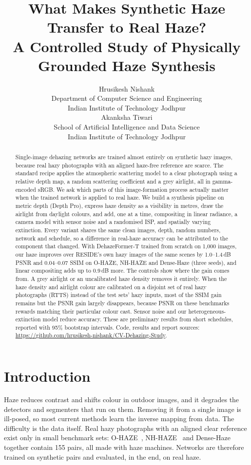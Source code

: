 \documentclass{article}
\title{What Makes Synthetic Haze Transfer to Real Haze?\\A Controlled Study of Physically Grounded Haze Synthesis}
\author{%
  Hrusikesh Nishank \\
  Department of Computer Science and Engineering\\
  Indian Institute of Technology Jodhpur \\
  \And
  Akanksha Tiwari \\
  School of Artificial Intelligence and Data Science\\
  Indian Institute of Technology Jodhpur \\
}
\begin{document}
\maketitle

\begin{abstract}
Single-image dehazing networks are trained almost entirely on synthetic hazy images, because real hazy photographs with an aligned haze-free reference are scarce. The standard recipe applies the atmospheric scattering model to a clear photograph using a relative depth map, a random scattering coefficient and a grey airlight, all in gamma-encoded sRGB. We ask which parts of this image-formation process actually matter when the trained network is applied to real haze. We build a synthesis pipeline on metric depth (Depth Pro), express haze density as a visibility in metres, draw the airlight from daylight colours, and add, one at a time, compositing in linear radiance, a camera model with sensor noise and a randomised ISP, and spatially varying extinction. Every variant shares the same clean images, depth, random numbers, network and schedule, so a difference in real-haze accuracy can be attributed to the component that changed. With DehazeFormer-T trained from scratch on 1{,}000 images, our haze improves over RESIDE's own hazy images of the same scenes by 1.0--1.4\,dB PSNR and 0.04--0.07 SSIM on O-HAZE, NH-HAZE and Dense-Haze (three seeds), and linear compositing adds up to 0.9\,dB more. The controls show where the gain comes from. A grey airlight or an uncalibrated haze density removes it entirely. When the haze density and airlight colour are calibrated on a disjoint set of real hazy photographs (RTTS) instead of the test sets' hazy inputs, most of the SSIM gain remains but the PSNR gain largely disappears, because PSNR on these benchmarks rewards matching their particular colour cast. Sensor noise and our heterogeneous-extinction model reduce accuracy. These are preliminary results from short schedules, reported with 95\% bootstrap intervals. Code, results and report sources: \url{https://github.com/hrusikesh-nishank/CV-Dehazing-Study}.
\end{abstract}

\section{Introduction}
\label{sec:intro}

Haze reduces contrast and shifts colour in outdoor images, and it degrades the detectors and segmenters that run on them. Removing it from a single image is ill-posed, so most current methods learn the inverse mapping from data. The difficulty is the data itself. Real hazy photographs with an aligned clear reference exist only in small benchmark sets: O-HAZE~\cite{ancuti2018ohaze}, NH-HAZE~\cite{ancuti2020nhhaze} and Dense-Haze~\cite{ancuti2019dense} together contain 155 pairs, all made with haze machines. Networks are therefore trained on synthetic pairs and evaluated, in the end, on real haze.
\end{document}
